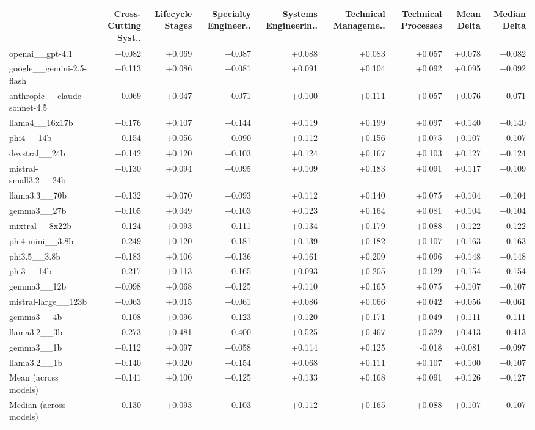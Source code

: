 \begin{tabular}{lrrrrrrrr}
\toprule
 & Cross-Cutting Syst.. & Lifecycle Stages & Specialty Engineer.. & Systems Engineerin.. & Technical Manageme.. & Technical Processes & Mean Delta & Median Delta \\
\midrule
openai\_\_gpt-4.1 & +0.082 & +0.069 & +0.087 & +0.088 & +0.083 & +0.057 & +0.078 & +0.082 \\
google\_\_gemini-2.5-flash & +0.113 & +0.086 & +0.081 & +0.091 & +0.104 & +0.092 & +0.095 & +0.092 \\
anthropic\_\_claude-sonnet-4.5 & +0.069 & +0.047 & +0.071 & +0.100 & +0.111 & +0.057 & +0.076 & +0.071 \\
llama4\_\_16x17b & +0.176 & +0.107 & +0.144 & +0.119 & +0.199 & +0.097 & +0.140 & +0.140 \\
phi4\_\_14b & +0.154 & +0.056 & +0.090 & +0.112 & +0.156 & +0.075 & +0.107 & +0.107 \\
devstral\_\_24b & +0.142 & +0.120 & +0.103 & +0.124 & +0.167 & +0.103 & +0.127 & +0.124 \\
mistral-small3.2\_\_24b & +0.130 & +0.094 & +0.095 & +0.109 & +0.183 & +0.091 & +0.117 & +0.109 \\
llama3.3\_\_70b & +0.132 & +0.070 & +0.093 & +0.112 & +0.140 & +0.075 & +0.104 & +0.104 \\
gemma3\_\_27b & +0.105 & +0.049 & +0.103 & +0.123 & +0.164 & +0.081 & +0.104 & +0.104 \\
mixtral\_\_8x22b & +0.124 & +0.093 & +0.111 & +0.134 & +0.179 & +0.088 & +0.122 & +0.122 \\
phi4-mini\_\_3.8b & +0.249 & +0.120 & +0.181 & +0.139 & +0.182 & +0.107 & +0.163 & +0.163 \\
phi3.5\_\_3.8b & +0.183 & +0.106 & +0.136 & +0.161 & +0.209 & +0.096 & +0.148 & +0.148 \\
phi3\_\_14b & +0.217 & +0.113 & +0.165 & +0.093 & +0.205 & +0.129 & +0.154 & +0.154 \\
gemma3\_\_12b & +0.098 & +0.068 & +0.125 & +0.110 & +0.165 & +0.075 & +0.107 & +0.107 \\
mistral-large\_\_123b & +0.063 & +0.015 & +0.061 & +0.086 & +0.066 & +0.042 & +0.056 & +0.061 \\
gemma3\_\_4b & +0.108 & +0.096 & +0.123 & +0.120 & +0.171 & +0.049 & +0.111 & +0.111 \\
llama3.2\_\_3b & +0.273 & +0.481 & +0.400 & +0.525 & +0.467 & +0.329 & +0.413 & +0.413 \\
gemma3\_\_1b & +0.112 & +0.097 & +0.058 & +0.114 & +0.125 & -0.018 & +0.081 & +0.097 \\
llama3.2\_\_1b & +0.140 & +0.020 & +0.154 & +0.068 & +0.111 & +0.107 & +0.100 & +0.107 \\
Mean (across models) & +0.141 & +0.100 & +0.125 & +0.133 & +0.168 & +0.091 & +0.126 & +0.127 \\
Median (across models) & +0.130 & +0.093 & +0.103 & +0.112 & +0.165 & +0.088 & +0.107 & +0.107 \\
\bottomrule
\end{tabular}

